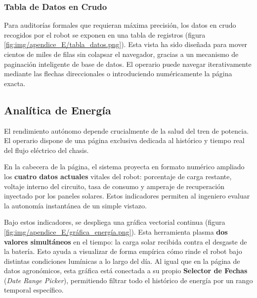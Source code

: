 
\subsubsection{Tabla de Datos en Crudo}
Para auditorías formales que requieran máxima precisión, los datos en crudo recogidos por el robot se exponen en una tabla de registros (figura \ref{fig:img/apendice_E/tabla_datos.png}). Esta vista ha sido diseñada para mover cientos de miles de filas sin colapsar el navegador, gracias a un mecanismo de paginación inteligente de base de datos. El operario puede navegar iterativamente mediante las flechas direccionales o introduciendo numéricamente la página exacta.




\subsection{Analítica de Energía}
El rendimiento autónomo depende crucialmente de la salud del tren de potencia. El operario dispone de una página exclusiva dedicada al histórico y tiempo real del flujo eléctrico del chasis.

En la cabecera de la página, el sistema proyecta en formato numérico ampliado los \textbf{cuatro datos actuales} vitales del robot: porcentaje de carga restante, voltaje interno del circuito, tasa de consumo y amperaje de recuperación inyectado por los paneles solares. Estos indicadores permiten al ingeniero evaluar la autonomía instantánea de un simple vistazo.

Bajo estos indicadores, se despliega una gráfica vectorial continua (figura \ref{fig:img/apendice_E/gráfica_energía.png}). Esta herramienta plasma \textbf{dos valores simultáneos} en el tiempo: la carga solar recibida contra el desgaste de la batería. Esto ayuda a visualizar de forma empírica cómo rinde el robot bajo distintas condiciones lumínicas a lo largo del día. Al igual que en la página de datos agronómicos, esta gráfica está conectada a su propio \textbf{Selector de Fechas} (\textit{Date Range Picker}), permitiendo filtrar todo el histórico de energía por un rango temporal específico.


